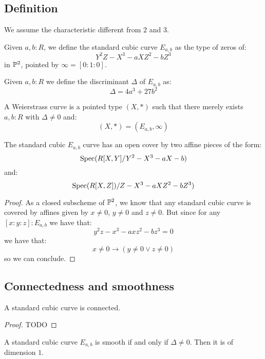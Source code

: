 \subsection{Definition}

We assume the characteristic different from $2$ and $3$.

\begin{definition}
Given $a,b:R$, we define the standard cubic curve $E_{a,b}$ as the type of zeros of:
\[Y^2Z - X^3 - a XZ^2 - b Z^3\]
in $\mathbb{P}^2$, pointed by $\infty = [0:1:0]$.
\end{definition}

\begin{definition}
Given $a,b:R$ we define the discriminant $\Delta$ of $E_{a,b}$ as:
\[\Delta = 4a^3 + 27 b^2\]
\end{definition}

\begin{definition}
A Weierstrass curve is a pointed type $(X,*)$ such that there merely exists $a,b:R$ with $\Delta\not=0$ and:
\[(X,*) = (E_{a,b},\infty)\]
\end{definition}

\begin{lemma}\label{standard-cover-cubic}
The standard cubic $E_{a,b}$ curve has an open cover by two affine pieces of the form:
\[\operatorname{Spec}(R[X,Y]/Y^2-X^3-aX-b)\]
and:
\[\operatorname{Spec}(R[X,Z])/Z-X^3-aXZ^2-bZ^3)\]
\end{lemma}

\begin{proof}
As a closed subscheme of $\mathbb{P}^2$, we know that any standard cubic curve is covered by affines given by $x\not=0$, $y\not=0$ and $z\not=0$. But since for any $[x:y:z]:E_{a,b}$ we have that:
\[y^2z - x^3 - a xz^2 - b z^3 = 0\]
we have that:
\[x\not=0 \to (y\not=0 \lor z\not=0)\]
so we can conclude.
\end{proof}

\subsection{Connectedness and smoothness}

\begin{lemma}
A standard cubic curve is connected.
\end{lemma}

\begin{proof}
TODO
\end{proof}

\begin{lemma}\label{smoothness-iff-discriminant-invertible}
A standard cubic curve $E_{a,b}$ is smooth if and only if $\Delta\not=0$. Then it is of dimension $1$.
\end{lemma}

